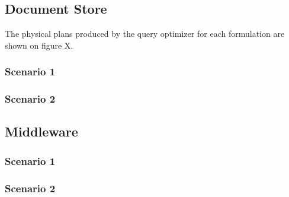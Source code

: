 \subsection{Document Store}

The physical plans produced by the query optimizer for each formulation are shown on figure X.

\subsubsection{Scenario 1}

\subsubsection{Scenario 2}

\subsection{Middleware}

\subsubsection{Scenario 1}

\subsubsection{Scenario 2}


